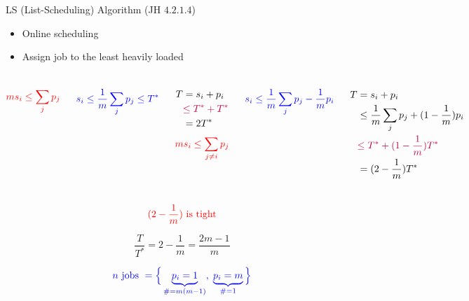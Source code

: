 \begin{frame}
  \begin{exampleblock}{LS (List-Scheduling) Algorithm (JH $4.2.1.4$)}
	\begin{itemize}
	  \item Online scheduling
	  \item Assign job to the least heavily loaded
	\end{itemize}
  \end{exampleblock}

  \pause
  \begin{columns}
	  \[
		\textcolor{red}{ms_i \le \sum_{j} p_j} 
	  \]

	  \[
		\textcolor{blue}{s_i \le \frac{1}{m} \sum_{j} p_j \le T^{\ast}}
	  \]

	  \pause
	  \begin{align*}
		T &= s_i + p_i \\
		  &\textcolor{purple}{\le T^{\ast} + T^{\ast}} \\
		  &= 2T^{\ast}
	  \end{align*}
	  \pause
	  \[
		\textcolor{red}{ms_i \le \sum_{\textcolor{red}{j \neq i}} p_j} 
	  \]

	  \[
		\textcolor{blue}{s_i \le \frac{1}{m} \sum_{j} p_j - \frac{1}{m} p_{i}}
	  \]

	  \pause
	  \begin{align*}
		T &= s_i + p_i \\
		&\le \frac{1}{m} \sum_{j} p_j + (1 - \frac{1}{m}) p_{i} \\
		&\textcolor{purple}{\le T^{\ast} + (1 - \frac{1}{m}) T^{\ast}} \\
		&= (2 - \frac{1}{m}) T^{\ast}
	  \end{align*}
  \end{columns}
\end{frame}

\begin{frame}
  \[
	\textcolor{red}{\text{$(2-\frac{1}{m})$ is tight}}
  \]

  \pause
  \vspace{0.30cm}
  \[
	\frac{T}{T^{\ast}} = 2 - \frac{1}{m} = \frac{2m - 1}{m}
  \]

  \pause
  \vspace{0.30cm}
  \[
	\textcolor{blue}{n \text{ jobs } = \Big\{ \underbrace{p_i = 1}_{\# = m(m - 1)},\; \underbrace{p_i = m}_{\# = 1} \Big\}}
  \]
\end{frame}

